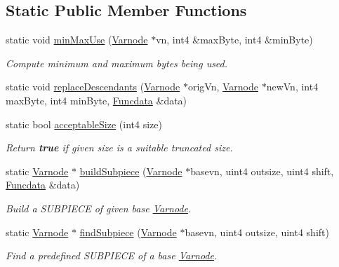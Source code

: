\subsection*{Static Public Member Functions}
\begin{DoxyCompactItemize}
\item 
static void \mbox{\hyperlink{class_rule_pullsub_multi_a4c0d85290c63eb31453f8348219f9d71}{min\+Max\+Use}} (\mbox{\hyperlink{class_varnode}{Varnode}} $\ast$vn, int4 \&max\+Byte, int4 \&min\+Byte)
\begin{DoxyCompactList}\small\item\em Compute minimum and maximum bytes being used. \end{DoxyCompactList}\item 
static void \mbox{\hyperlink{class_rule_pullsub_multi_a913ef535547efd0f181a08dfff49beab}{replace\+Descendants}} (\mbox{\hyperlink{class_varnode}{Varnode}} $\ast$orig\+Vn, \mbox{\hyperlink{class_varnode}{Varnode}} $\ast$new\+Vn, int4 max\+Byte, int4 min\+Byte, \mbox{\hyperlink{class_funcdata}{Funcdata}} \&data)
\item 
static bool \mbox{\hyperlink{class_rule_pullsub_multi_a9bbbf48ca07f76c7d40a53feb65eded7}{acceptable\+Size}} (int4 size)
\begin{DoxyCompactList}\small\item\em Return {\bfseries{true}} if given size is a suitable truncated size. \end{DoxyCompactList}\item 
static \mbox{\hyperlink{class_varnode}{Varnode}} $\ast$ \mbox{\hyperlink{class_rule_pullsub_multi_a9195ceded3ce1f8d7d12bb52c8e268db}{build\+Subpiece}} (\mbox{\hyperlink{class_varnode}{Varnode}} $\ast$basevn, uint4 outsize, uint4 shift, \mbox{\hyperlink{class_funcdata}{Funcdata}} \&data)
\begin{DoxyCompactList}\small\item\em Build a S\+U\+B\+P\+I\+E\+CE of given base \mbox{\hyperlink{class_varnode}{Varnode}}. \end{DoxyCompactList}\item 
static \mbox{\hyperlink{class_varnode}{Varnode}} $\ast$ \mbox{\hyperlink{class_rule_pullsub_multi_a92f1aaf99bec05ceb9a6fc3a418a6851}{find\+Subpiece}} (\mbox{\hyperlink{class_varnode}{Varnode}} $\ast$basevn, uint4 outsize, uint4 shift)
\begin{DoxyCompactList}\small\item\em Find a predefined S\+U\+B\+P\+I\+E\+CE of a base \mbox{\hyperlink{class_varnode}{Varnode}}. \end{DoxyCompactList}\end{DoxyCompactItemize}
